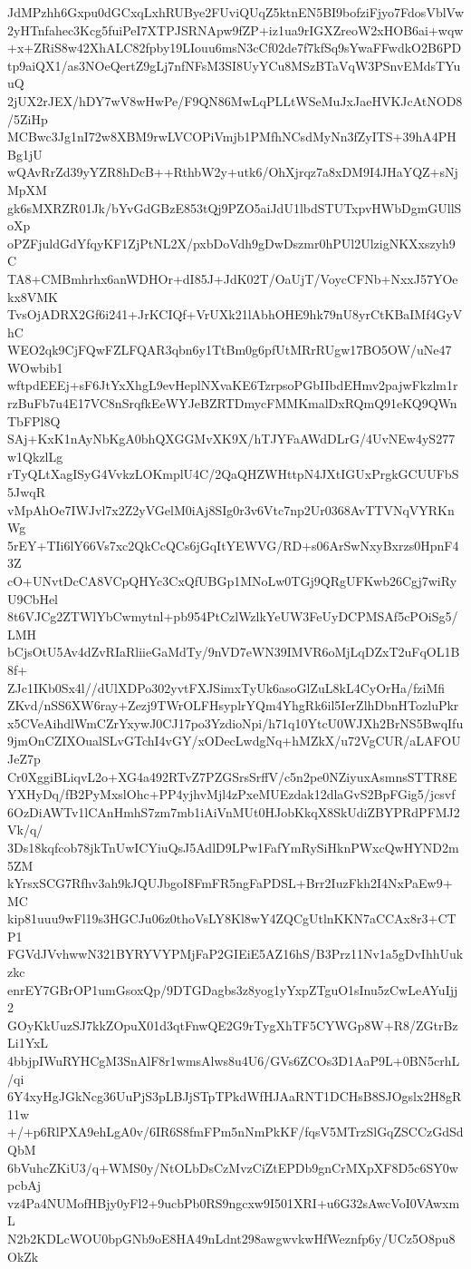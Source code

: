 JdMPzhh6Gxpu0dGCxqLxhRUBye2FUviQUqZ5ktnEN5BI9bofziFjyo7FdosVblVw
2yHTnfahec3Kcg5fuiPeI7XTPJSRNApw9fZP+iz1ua9rIGXZreoW2xHOB6ai+wqw
+x+ZRiS8w42XhALC82fpby19LIouu6msN3cCf02de7f7kfSq9sYwaFFwdkO2B6PD
tp9aiQX1/as3NOeQertZ9gLj7nfNFsM3SI8UyYCu8MSzBTaVqW3PSnvEMdsTYuuQ
2jUX2rJEX/hDY7wV8wHwPe/F9QN86MwLqPLLtWSeMuJxJaeHVKJcAtNOD8/5ZiHp
MCBwc3Jg1nI72w8XBM9rwLVCOPiVmjb1PMfhNCsdMyNn3fZyITS+39hA4PHBg1jU
wQAvRrZd39yYZR8hDcB++RthbW2y+utk6/OhXjrqz7a8xDM9I4JHaYQZ+sNjMpXM
gk6sMXRZR01Jk/bYvGdGBzE853tQj9PZO5aiJdU1lbdSTUTxpvHWbDgmGUllSoXp
oPZFjuldGdYfqyKF1ZjPtNL2X/pxbDoVdh9gDwDszmr0hPUl2UlzigNKXxszyh9C
TA8+CMBmhrhx6anWDHOr+dI85J+JdK02T/OaUjT/VoycCFNb+NxxJ57YOekx8VMK
TvsOjADRX2Gf6i241+JrKCIQf+VrUXk21lAbhOHE9hk79nU8yrCtKBaIMf4GyVhC
WEO2qk9CjFQwFZLFQAR3qbn6y1TtBm0g6pfUtMRrRUgw17BO5OW/uNe47WOwbib1
wftpdEEEj+sF6JtYxXhgL9evHeplNXvaKE6TzrpsoPGbIIbdEHmv2pajwFkzlm1r
rzBuFb7u4E17VC8nSrqfkEeWYJeBZRTDmycFMMKmalDxRQmQ91eKQ9QWnTbFPl8Q
SAj+KxK1nAyNbKgA0bhQXGGMvXK9X/hTJYFaAWdDLrG/4UvNEw4yS277w1QkzlLg
rTyQLtXagISyG4VvkzLOKmplU4C/2QaQHZWHttpN4JXtIGUxPrgkGCUUFbS5JwqR
vMpAhOe7IWJvl7x2Z2yVGelM0iAj8SIg0r3v6Vtc7np2Ur0368AvTTVNqVYRKnWg
5rEY+TIi6lY66Vs7xc2QkCcQCs6jGqItYEWVG/RD+s06ArSwNxyBxrzs0HpnF43Z
cO+UNvtDcCA8VCpQHYc3CxQfUBGp1MNoLw0TGj9QRgUFKwb26Cgj7wiRyU9CbHel
8t6VJCg2ZTWlYbCwmytnl+pb954PtCzlWzlkYeUW3FeUyDCPMSAf5cPOiSg5/LMH
bCjsOtU5Av4dZvRIaRliieGaMdTy/9nVD7eWN39IMVR6oMjLqDZxT2uFqOL1B8f+
ZJc1IKb0Sx4l//dUlXDPo302yvtFXJSimxTyUk6asoGlZuL8kL4CyOrHa/fziMfi
ZKvd/nSS6XW6ray+Zezj9TWrOLFHsyplrYQm4YhgRk6il5IerZlhDbnHTozluPkr
x5CVeAihdlWmCZrYxywJ0CJ17po3YzdioNpi/h71q10YtcU0WJXh2BrNS5BwqIfu
9jmOnCZIXOualSLvGTchI4vGY/xODecLwdgNq+hMZkX/u72VgCUR/aLAFOUJeZ7p
Cr0XggiBLiqvL2o+XG4a492RTvZ7PZGSrsSrffV/c5n2pe0NZiyuxAsmnsSTTR8E
YXHyDq/fB2PyMxslOhc+PP4yjhvMjl4zPxeMUEzdak12dlaGvS2BpFGig5/jcsvf
6OzDiAWTv1lCAnHmhS7zm7mb1iAiVnMUt0HJobKkqX8SkUdiZBYPRdPFMJ2Vk/q/
3Ds18kqfcob78jkTnUwICYiuQsJ5AdlD9LPw1FafYmRySiHknPWxcQwHYND2m5ZM
kYrsxSCG7Rfhv3ah9kJQUJbgoI8FmFR5ngFaPDSL+Brr2IuzFkh2I4NxPaEw9+MC
kip81uuu9wFl19s3HGCJu06z0thoVsLY8Kl8wY4ZQCgUtlnKKN7aCCAx8r3+CTP1
FGVdJVvhwwN321BYRYVYPMjFaP2GIEiE5AZ16hS/B3Prz11Nv1a5gDvIhhUukzkc
enrEY7GBrOP1umGsoxQp/9DTGDagbs3z8yog1yYxpZTguO1sInu5zCwLeAYuIjj2
GOyKkUuzSJ7kkZOpuX01d3qtFnwQE2G9rTygXhTF5CYWGp8W+R8/ZGtrBzLi1YxL
4bbjpIWuRYHCgM3SnAlF8r1wmsAlws8u4U6/GVs6ZCOs3D1AaP9L+0BN5crhL/qi
6Y4xyHgJGkNcg36UuPjS3pLBJjSTpTPkdWfHJAaRNT1DCHsB8SJOgslx2H8gR11w
+/+p6RlPXA9ehLgA0v/6IR6S8fmFPm5nNmPkKF/fqsV5MTrzSlGqZSCCzGdSdQbM
6bVuhcZKiU3/q+WMS0y/NtOLbDsCzMvzCiZtEPDb9gnCrMXpXF8D5c6SY0wpcbAj
vz4Pa4NUMofHBjy0yFl2+9ucbPb0RS9ngcxw9I501XRI+u6G32sAwcVoI0VAwxmL
N2b2KDLcWOU0bpGNb9oE8HA49nLdnt298awgwvkwHfWeznfp6y/UCz5O8pu8OkZk
